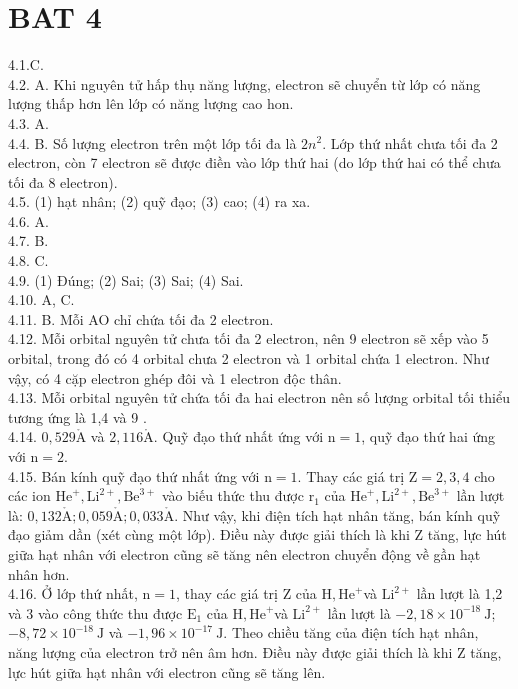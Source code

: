 \documentclass[10pt]{article}
\def\AA{\mathring{\mathrm{A}}}
\begin{document}
\section*{BAT 4}
4.1.C.\\
4.2. A. Khi nguyên tử hấp thụ năng lượng, electron sẽ chuyển từ lớp có năng lượng thấp hơn lên lớp có năng lượng cao hon.\\
4.3. A.\\
4.4. B. Số lượng electron trên một lớp tối đa là $2 n^{2}$. Lớp thứ nhất chưa tối đa 2 electron, còn 7 electron sẽ được điền vào lớp thứ hai (do lớp thứ hai có thể chưa tối đa 8 electron).\\
4.5. (1) hạt nhân; (2) quỹ đạo; (3) cao; (4) ra xa.\\
4.6. A.\\
4.7. B.\\
4.8. C.\\
4.9. (1) Đúng; (2) Sai; (3) Sai; (4) Sai.\\
4.10. A, C.\\
4.11. B. Mỗi AO chỉ chứa tối đa 2 electron.\\
4.12. Mỗi orbital nguyên tử chưa tối đa 2 electron, nên 9 electron sẽ xếp vào 5 orbital, trong đó có 4 orbital chưa 2 electron và 1 orbital chứa 1 electron. Như vậy, có 4 cặp electron ghép đôi và 1 electron độc thân.\\
4.13. Mỗi orbital nguyên tử chứa tối đa hai electron nên số lượng orbital tối thiểu tương ứng là 1,4 và 9 .\\
4.14. $0,529 \AA$ và $2,116 \AA$. Quỹ đạo thứ nhất ứng với $\mathrm{n}=1$, quỹ đạo thứ hai ứng với $\mathrm{n}=2$.\\
4.15. Bán kính quỹ đạo thứ nhất ứng với $\mathrm{n}=1$. Thay các giá trị $\mathrm{Z}=2,3,4$ cho các ion $\mathrm{He}^{+}, \mathrm{Li}^{2+}, \mathrm{Be}^{3+}$ vào biếu thức thu được $\mathrm{r}_{1}$ của $\mathrm{He}^{+}, \mathrm{Li}^{2+}, \mathrm{Be}^{3+}$ lần lượt là: $0,132 \AA ; 0,059 \AA ; 0,033 \AA$. Như vậy, khi điện tích hạt nhân tăng, bán kính quỹ đạo giảm dần (xét cùng một lớp). Điều này được giải thích là khi Z tăng, lực hút giữa hạt nhân với electron cũng sẽ tăng nên electron chuyển động về gần hạt nhân hơn.\\
4.16. Ở lớp thứ nhất, $\mathrm{n}=1$, thay các giá trị Z của $\mathrm{H}, \mathrm{He}^{+}$và $\mathrm{Li}^{2+}$ lần lượt là 1,2 và 3 vào công thức thu được $\mathrm{E}_{1}$ của $\mathrm{H}, \mathrm{He}^{+}$và $\mathrm{Li}^{2+}$ lần lượt là $-2,18 \times 10^{-18} \mathrm{~J}$; $-8,72 \times 10^{-18} \mathrm{~J}$ và $-1,96 \times 10^{-17} \mathrm{~J}$. Theo chiều tăng của điện tích hạt nhân, năng lượng của electron trở nên âm hơn. Điều này được giải thích là khi Z tăng, lực hút giữa hạt nhân với electron cũng sẽ tăng lên.
\end{document}

